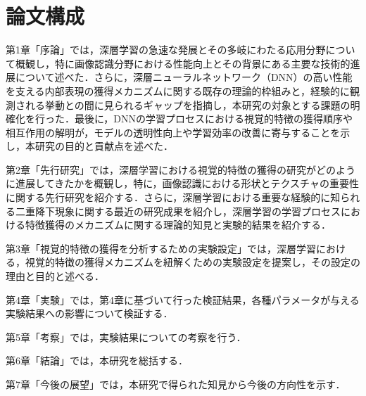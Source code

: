 \section{論文構成}
第1章「序論」では，深層学習の急速な発展とその多岐にわたる応用分野について概観し，特に画像認識分野における性能向上とその背景にある主要な技術的進展について述べた．さらに，深層ニューラルネットワーク（DNN）の高い性能を支える内部表現の獲得メカニズムに関する既存の理論的枠組みと，経験的に観測される挙動との間に見られるギャップを指摘し，本研究の対象とする課題の明確化を行った．最後に，DNNの学習プロセスにおける視覚的特徴の獲得順序や相互作用の解明が，モデルの透明性向上や学習効率の改善に寄与することを示し，本研究の目的と貢献点を述べた．\par
第2章「先行研究」では，深層学習における視覚的特徴の獲得の研究がどのように進展してきたかを概観し，特に，画像認識における形状とテクスチャの重要性に関する先行研究を紹介する．さらに，深層学習における重要な経験的に知られる二重降下現象に関する最近の研究成果を紹介し，深層学習の学習プロセスにおける特徴獲得のメカニズムに関する理論的知見と実験的結果を紹介する．\par
第3章「視覚的特徴の獲得を分析するための実験設定」では，深層学習における，視覚的特徴の獲得メカニズムを紐解くための実験設定を提案し，その設定の理由と目的と述べる．\par
第4章「実験」では，第4章に基づいて行った検証結果，各種パラメータが与える実験結果への影響について検証する．\par
第5章「考察」では，実験結果についての考察を行う．\par
第6章「結論」では，本研究を総括する．\par
第7章「今後の展望」では，本研究で得られた知見から今後の方向性を示す．\par
\newpage